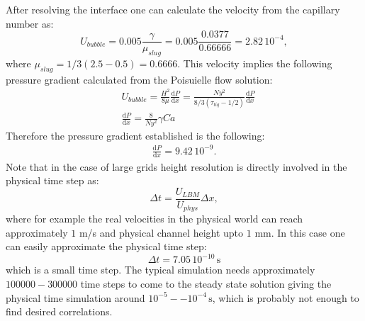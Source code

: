 \documentclass{article}
\begin{document}
\begin{description}
After resolving the interface one can  calculate the
  velocity from the capillary number as:
  \begin{equation}
  U_{bubble}=0.005 \frac{\gamma}{\mu_{slug}}=0.005
\frac{0.0377}{0.66666}=2.82\,10^{-4},
  \end{equation}
  where $\mu_{slug}=1/3 (2.5-0.5)=0.6666$.
  This velocity implies the following pressure gradient calculated from the
  Poisuielle flow solution:
  \begin{equation}
  \begin{aligned}
  &U_{bubble}=\frac{H^2}{8\mu} \frac{\mathrm{d}P}{\mathrm{d}x}=\frac{Ny^2}{8/3
  (\tau_{liq}-1/2)}\frac{\mathrm{d}P}{\mathrm{d}x}\\
  &\frac{\mathrm{d}P}{\mathrm{d}x}=\frac{8}{Ny^2}\gamma Ca
  \end{aligned}
  \end{equation}
  Therefore the pressure gradient established is the following:
  \begin{equation}
  \begin{aligned}
  \frac{\mathrm{d}P}{\mathrm{d}x}=9.42\, 10^{-9}.
  \end{aligned}
  \end{equation}
  Note that in the case of large grids  height resolution is directly
involved in	
the physical time step as:
\begin{equation}
\Delta t =\frac{U_{LBM}}{U_{phys}} \Delta x ,
\end{equation}
where for example the real velocities in the physical world can reach
approximately $1$ m/s and physical channel height upto $1$ mm. In this case one
can easily approximate the physical time step:
\begin{equation}
\Delta t = 7.05 \, 10^{-10} \,\mathrm{s}
\end{equation}
which is a small time step. The typical simulation needs approximately
$100000-300000$ time steps to come to the steady state solution giving the
physical time simulation around $10^{-5}--10^{-4}\,\mathrm{s}$, which is
probably not enough to find desired correlations.


\end{description}
\end{document}
